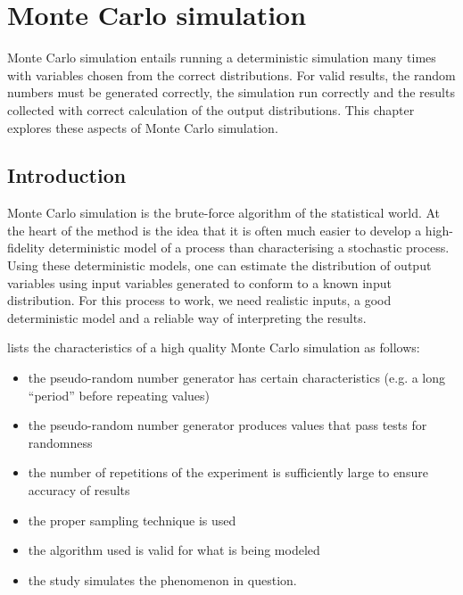 \chapter{Monte Carlo simulation}

\begin{overview}
  Monte Carlo simulation entails running a deterministic simulation many times with variables chosen from the correct distributions.
  For valid results, the random numbers must be generated correctly, the simulation run correctly and the results collected with correct calculation of the output distributions.
  This chapter explores these aspects of Monte Carlo simulation.
\end{overview}

\section{Introduction}
Monte Carlo simulation is the brute-force algorithm of the statistical world. 
At the heart of the method is the idea that it is often much easier to develop a high-fidelity deterministic model of a process than characterising a stochastic process.  
Using these deterministic models, one can estimate the distribution of output variables using input variables generated to conform to a known input distribution.
For this process to work, we need realistic inputs, a good deterministic model and a reliable way of interpreting the results.


\citet{sawilowsky2003you} lists the characteristics of a high quality Monte Carlo simulation as follows:

\begin{itemize}
\item the pseudo-random number generator has certain characteristics  (e.g. a long “period” before repeating values)
\item the pseudo-random number generator produces values that pass tests for randomness 
\item the number of repetitions of the experiment is sufficiently large to
  ensure accuracy of results 
\item the proper sampling technique is used 
\item the algorithm used is valid for what is being modeled 
\item the study simulates the phenomenon in question.
\end{itemize}


